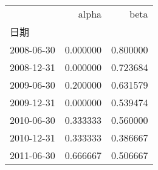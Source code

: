 \begin{tabular}{lrr}
\toprule
{} &     alpha &      beta \\
日期         &           &           \\
\midrule
2008-06-30 &  0.000000 &  0.800000 \\
2008-12-31 &  0.000000 &  0.723684 \\
2009-06-30 &  0.200000 &  0.631579 \\
2009-12-31 &  0.000000 &  0.539474 \\
2010-06-30 &  0.333333 &  0.560000 \\
2010-12-31 &  0.333333 &  0.386667 \\
2011-06-30 &  0.666667 &  0.506667 \\
\bottomrule
\end{tabular}
